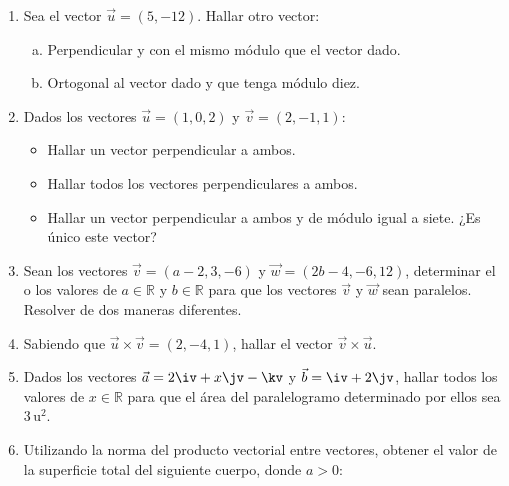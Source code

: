 \begin{enumerate}[\hspace{-3mm}$1)$]
\item Sea el vector $\vec u=(5,-12)$. Hallar otro vector:
\begin{enumerate}[a)]
\item Perpendicular y con el mismo módulo que el vector dado.
\item Ortogonal al vector dado y que tenga módulo diez.
\end{enumerate}

\item Dados los vectores $\vec u=(1,0,2)$ y $\vec v=(2,-1,1)$:
\begin{itemize}
\item[a)] Hallar un vector perpendicular a ambos.
\item[b)] Hallar todos los vectores perpendiculares a ambos.
\item[c)] Hallar un vector perpendicular a ambos y de módulo igual a siete. ¿Es único este vector?
\end{itemize}

\item Sean los vectores $\vec v=(a-2,3,-6)$ y $\vec w=(2b-4,-6,12)$, determinar el o los valores de $a\in\mathbb{R}$ y $b\in\mathbb{R}$ para que los vectores $\vec v$ y $\vec w$ sean paralelos. Resolver de dos maneras diferentes.

\item Sabiendo que $\vec u\times\vec v=(2,-4,1)$, hallar el vector $\vec v\times\vec u$.

\item Dados los vectores $\vec a=2\iv+x\jv-\kv$ y $\vec b=\iv+2\jv$, hallar todos los valores de $x\in\mathbb{R}$ para que el área del paralelogramo determinado por ellos sea $3\,\text{u}^2$.

\item Utilizando la norma del producto vectorial entre vectores, obtener el valor de la superficie total del siguiente cuerpo, donde $a>0$:

\begin{center}
\end{center}


\end{enumerate}
